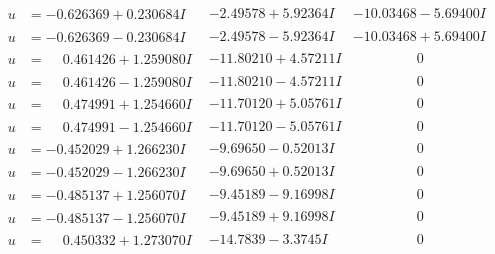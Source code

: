 \documentclass[1p]{elsarticle_modified}
\theoremstyle{definition}
\begin{document}
$$\begin{array}{c|c|c}
\begin{aligned}
u &= -0.626369 + 0.230684 I\end{aligned}
 & -2.49578 + 5.92364 I & -10.03468 - 5.69400 I \\ \hline\begin{aligned}
u &= -0.626369 - 0.230684 I\end{aligned}
 & -2.49578 - 5.92364 I & -10.03468 + 5.69400 I \\ \hline\begin{aligned}
u &= \phantom{-}0.461426 + 1.259080 I\end{aligned}
 & -11.80210 + 4.57211 I & \phantom{-0.000000 } 0 \\ \hline\begin{aligned}
u &= \phantom{-}0.461426 - 1.259080 I\end{aligned}
 & -11.80210 - 4.57211 I & \phantom{-0.000000 } 0 \\ \hline\begin{aligned}
u &= \phantom{-}0.474991 + 1.254660 I\end{aligned}
 & -11.70120 + 5.05761 I & \phantom{-0.000000 } 0 \\ \hline\begin{aligned}
u &= \phantom{-}0.474991 - 1.254660 I\end{aligned}
 & -11.70120 - 5.05761 I & \phantom{-0.000000 } 0 \\ \hline\begin{aligned}
u &= -0.452029 + 1.266230 I\end{aligned}
 & -9.69650 - 0.52013 I & \phantom{-0.000000 } 0 \\ \hline\begin{aligned}
u &= -0.452029 - 1.266230 I\end{aligned}
 & -9.69650 + 0.52013 I & \phantom{-0.000000 } 0 \\ \hline\begin{aligned}
u &= -0.485137 + 1.256070 I\end{aligned}
 & -9.45189 - 9.16998 I & \phantom{-0.000000 } 0 \\ \hline\begin{aligned}
u &= -0.485137 - 1.256070 I\end{aligned}
 & -9.45189 + 9.16998 I & \phantom{-0.000000 } 0 \\ \hline\begin{aligned}
u &= \phantom{-}0.450332 + 1.273070 I\end{aligned}
 & -14.7839 - 3.3745 I & \phantom{-0.000000 } 0 \\ \hline\begin{aligned}

\end{aligned}
\end{array}$$
\end{document}
